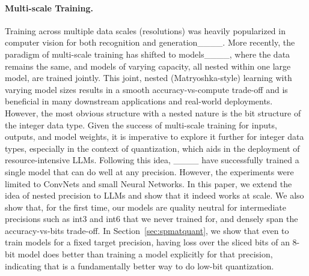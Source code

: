\paragraph{Multi-scale Training.} Training across multiple data scales (resolutions) was heavily popularized in computer vision for both recognition and generation____. More recently, the paradigm of multi-scale training has shifted to models____, where the data remains the same, and models of varying capacity, all nested within one large model, are trained jointly. This joint, nested (Matryoshka-style) learning with varying model sizes results in a smooth accuracy-vs-compute trade-off and is beneficial in many downstream applications and real-world deployments. However, the most obvious structure with a nested nature is the bit structure of the integer data type. Given the success of multi-scale training for inputs, outputs, and model weights, it is imperative to explore it further for integer data types, especially in the context of quantization, which aids in the deployment of resource-intensive LLMs. Following this idea, ____ have successfully trained a single model that can do well at any precision. However, the experiments were limited to ConvNets and small Neural Networks. In this paper, we extend the idea of nested precision to LLMs and show that it indeed works at scale. We also show that, for the first time, our models are quality neutral for intermediate precisions such as int3 and int6 that we never trained for, and densely span the accuracy-vs-bits trade-off. In Section~\ref{sec:spmatquant}, we show that even to train models for a fixed target precision, having loss over the sliced bits of an 8-bit model does better than training a model explicitly for that precision, indicating that \alg is a fundamentally better way to do low-bit quantization.

